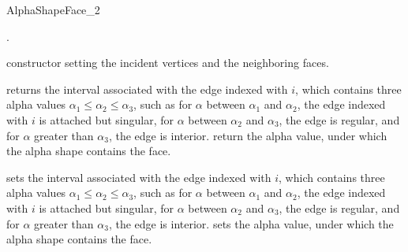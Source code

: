 \begin{ccRefConcept}{AlphaShapeFace_2}

\ccDefinition


\ccRefines
{}.


\ccTypes



\ccCreation

\begin{ccAdvanced}

\ccGlue
{}
\ccGlue
{} 
{constructor setting the incident vertices and the neighboring faces.}

\end{ccAdvanced}

{returns the interval associated with the edge indexed with $i$, which contains
three alpha values
 $\alpha_1 \leq \alpha_2 \leq \alpha_3$, such as for
$\alpha$  between $\alpha_1$ and $\alpha_2$, the edge indexed with $i$ is
attached but singular, 
for $\alpha$ between $\alpha_2$ and $\alpha_3$, the edge is regular, and for $\alpha$
greater than $\alpha_3$, the edge is interior.}
{return the alpha value, under which the alpha shape contains the
face.}

\ccModifiers

\begin{ccAdvanced}

{sets the interval associated with the edge indexed with $i$, which contains three
alpha values
 $\alpha_1 \leq \alpha_2 \leq \alpha_3$, such as for
$\alpha$  between $\alpha_1$ and $\alpha_2$, the edge indexed with $i$ is
attached but singular, 
for $\alpha$ between $\alpha_2$ and $\alpha_3$, the edge is regular, and for $\alpha$
greater than $\alpha_3$, the edge is interior.}
{sets the alpha value, under which the alpha shape contains the
face.}

\end{ccAdvanced}

\end{ccRefConcept}
